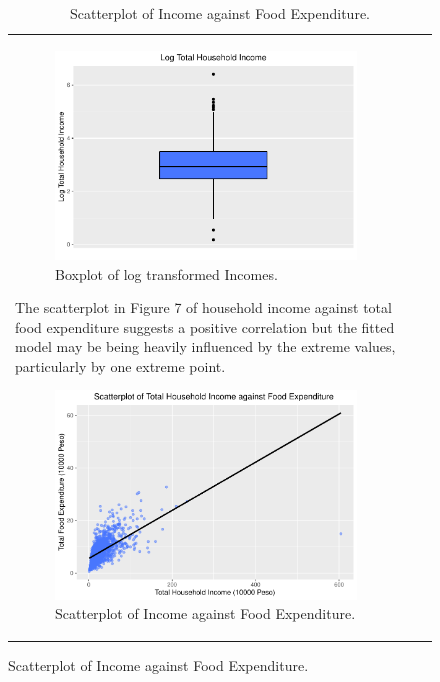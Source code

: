 \documentclass[
]{article}
\begin{document}
\begin{figure}[H]
\begin{table}[H]
\begin{tabular}[t]{lrr}
\begin{figure}[H]

{\centering \includegraphics[width=0.8\linewidth]{Group_01_Project2_demo_files/figure-latex/balance boxplot2-1} 

}

\caption{Boxplot of log transformed Incomes.}\label{fig:balance boxplot2}
\end{figure}

The scatterplot in Figure 7 of household income against total food
expenditure suggests a positive correlation but the fitted model may be
being heavily influenced by the extreme values, particularly by one
extreme point.

\begin{figure}[H]

{\centering \includegraphics[width=0.8\linewidth]{Group_01_Project2_demo_files/figure-latex/balance_plot-1} 

}

\caption{Scatterplot of Income against Food Expenditure.}\label{fig:balance_plot}
\end{figure}


\end{tabular}
\end{table}
\end{figure}
\end{document}
